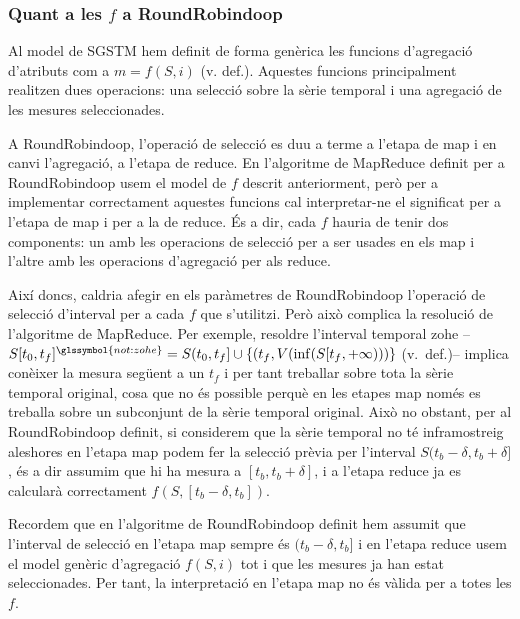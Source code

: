 \subsubsection{Quant a les $f$ a RoundRobindoop}
\label{sec:mapreduce:f}

Al model de \gls{SGSTM} hem definit de forma genèrica les funcions
d'agregació d'atributs com a $m=f(S,i)$ (v. def.). Aquestes funcions
principalment realitzen dues operacions: una selecció sobre la sèrie
temporal i una agregació de les mesures seleccionades. 

A RoundRobindoop, l'operació de selecció es duu a terme a l'etapa de
map i en canvi l'agregació, a l'etapa de reduce.  En l'algoritme de
MapReduce definit per a RoundRobindoop usem el model de $f$ descrit
anteriorment, però per a implementar correctament aquestes funcions
cal interpretar-ne el significat per a l'etapa de map i per a la de
reduce. És a dir, cada $f$ hauria de tenir dos components: un amb les
operacions de selecció per a ser usades en els map i l'altre amb les
operacions d'agregació per als reduce.


Així doncs, caldria afegir en els paràmetres de RoundRobindoop
l'operació de selecció d'interval per a cada $f$ que s'utilitzi. Però
això complica la resolució de l'algoritme de MapReduce. Per exemple,
resoldre l'interval temporal \gls{zohe}
--$S[t_0,t_f]^{\glssymbol{not:zohe}} = S(t_0,t_f] \cup \{
(t_f,V(\inf(S[t_f,+\infty))) \}$ (v.~def.)--
implica conèixer la mesura següent a un $t_f$ i per tant treballar
sobre tota la sèrie temporal original, cosa que no és possible perquè
en les etapes map només es treballa sobre un subconjunt de la sèrie
temporal original. Això no obstant, per al RoundRobindoop definit, si
considerem que la sèrie temporal no té inframostreig aleshores en l'etapa
map podem fer la selecció prèvia per l'interval
$S(t_b-\delta,t_b+\delta]$, és a dir assumim que hi ha mesura a
$[t_b,t_b+\delta]$, i a l'etapa reduce ja es calcularà correctament
$f(S,[t_b-\delta,t_b])$. 


Recordem que en l'algoritme de RoundRobindoop definit hem assumit que
l'interval de selecció en l'etapa map sempre és $(t_b-\delta,t_b]$ i
en l'etapa reduce usem el model genèric d'agregació $f(S,i)$ tot i que
les mesures ja han estat seleccionades. Per tant, la interpretació en
l'etapa map no és vàlida per a totes les $f$.

